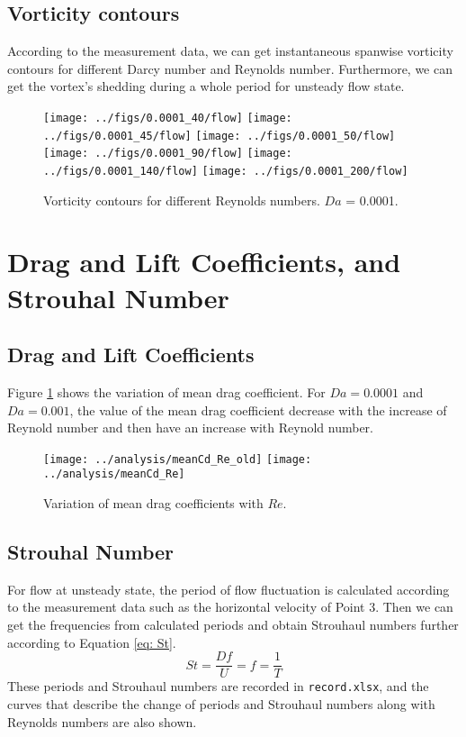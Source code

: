 \subsection{Vorticity contours}
According to the measurement data, we can get instantaneous spanwise
vorticity contours for different Darcy number and Reynolds number. 
Furthermore, we can get the vortex's shedding during a whole period
for unsteady flow state.
\begin{figure}[h]
	\centering
	{\texttt{[image: ../figs/0.0001\_40/flow]}}
	{\texttt{[image: ../figs/0.0001\_45/flow]}}
	{\texttt{[image: ../figs/0.0001\_50/flow]}}
	{\texttt{[image: ../figs/0.0001\_90/flow]}}
	{\texttt{[image: ../figs/0.0001\_140/flow]}}
	{\texttt{[image: ../figs/0.0001\_200/flow]}}
	\caption{Vorticity contours for different Reynolds numbers.
		$Da$ = 0.0001.}
\end{figure}


\section{Drag and Lift Coefficients, and Strouhal Number}
\subsection{Drag and Lift Coefficients}
Figure \ref{fig: meanCd} shows the variation of mean drag coefficient. For $Da=0.0001$ and $Da=0.001$, the value of the mean drag coefficient decrease with the increase of Reynold number and then have an increase with Reynold number.
\begin{figure}[h]
	\centering
	{\texttt{[image: ../analysis/meanCd\_Re\_old]}}
	{\texttt{[image: ../analysis/meanCd\_Re]}}
	\caption{Variation of mean drag coefficients with $Re$.}
	\label{fig: meanCd}
\end{figure}

\subsection{Strouhal Number}
For flow at unsteady state, the period of flow fluctuation is calculated
according to the measurement data such as the horizontal velocity of Point 3.
Then we can get the frequencies from calculated periods and obtain
Strouhaul numbers further according to Equation \ref{eq: St}.
\begin{equation}\label{eq: St}
St = \frac{Df}{U} = f = \frac{1}{T}
\end{equation}
These periods and Strouhaul numbers are recorded in \texttt{record.xlsx}, 
and the curves that describe the change of periods and Strouhaul numbers
along with Reynolds numbers are also shown.

